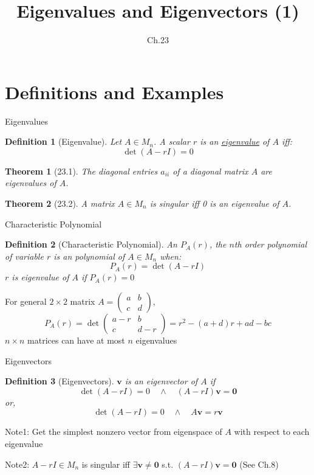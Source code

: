 \documentclass[a4paper,11pt]{article}
\author[조남운]{\mail}
\title{Eigenvalues and Eigenvectors (1)}
\subtitle{Ch.23}
\newtheorem{defn}{Definition}
\newtheorem{thm}{Theorem}
\newcommand{\bd}{\mathbf}
\begin{document}
	
\maketitle


\section{Definitions and Examples} %
\label{sec:definitions_and_examples}
\begin{frame}[t]{Eigenvalues}
	\begin{defn}
		[Eigenvalue] Let $A\in M_n$. A scalar $r$ is an \uline{eigenvalue} of $A$ iff:
		\[
			\det(A-rI)=0
		\]
	\end{defn}
	\begin{thm}
		[23.1] The diagonal entries $a_{ii}$ of a diagonal matrix $A$ are eigenvalues of $A$.
	\end{thm}
	\begin{thm}
		[23.2] A matrix $A\in M_n$ is singular iff 0 is an eigenvalue of $A$. 
	\end{thm}
\end{frame}

\begin{frame}[t]{Characteristic Polynomial}
	\begin{defn}
		[Characteristic Polynomial] An $P_A(r)$, the $n$th order polynomial of variable $r$ is an polynomial of $A\in M_n$ when:\[
			P_A(r)=\det(A-rI) 
		\]
		$r$ is eigenvalue of $A$ if $P_A(r)=0$
	\end{defn}
	For general $2\times 2$ matrix $A = \begin{pmatrix}
		a & b\\c&d
	\end{pmatrix}$, 
	\[
		P_A(r) = \det \begin{pmatrix}
			a-r & b \\
			c & d-r
		\end{pmatrix} = r^2 - (a+d)r+ad-bc
	\]
	$n\times n$ matrices can have at most $n$ eigenvalues
\end{frame}
\begin{frame}[t]{Eigenvectors}
	\begin{defn}
		[Eigenvectors] $\bd{v}$ is an eigenvector of $A$ if \[
			\det(A-rI)=0 \quad \land \quad (A-rI)\bd{v}=\bd{0}
		\]or, \[
			\det(A-rI)=0 \quad \land \quad A\bd{v} = r\bd{v}
		\]
	\end{defn}
	Note1: Get the simplest nonzero vector from eigenspace of $A$ with respect to each eigenvalue
	 
	Note2: $A-rI\in M_n$ is singular iff $\exists \bd{v}\neq \bd{0}$  s.t. $(A-rI)\bd{v}=\bd{0}$ (See Ch.8)
\end{frame}
\end{document}
